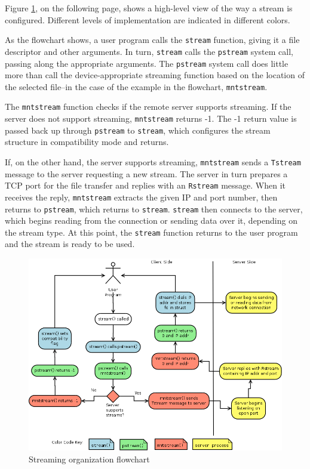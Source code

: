 \documentclass[11pt,american]{report}
\begin{document}
Figure \ref{figure:flowchart}, on the following page, shows a high-level view of the way a stream is configured. Different levels of implementation are indicated in different colors. 

As the flowchart shows, a user program calls the {\tt stream} function, giving it a file descriptor and other arguments. In turn, {\tt stream} calls the {\tt pstream} system call, passing along the appropriate arguments. The {\tt pstream} system call does little more than call the device-appropriate streaming function based on the location of the selected file--in the case of the example in the flowchart, {\tt mntstream}.

The {\tt mntstream} function checks if the remote server supports streaming. If the server does not support streaming, {\tt mntstream} returns -1. The -1 return value is passed back up through {\tt pstream} to {\tt stream}, which configures the stream structure in compatibility mode and returns.

If, on the other hand, the server supports streaming, {\tt mntstream} sends a {\tt Tstream} message to the server requesting a new stream. The server in turn prepares a TCP port for the file transfer and replies with an {\tt Rstream} message. When it receives the reply, {\tt mntstream} extracts the given IP and port number, then returns to {\tt pstream}, which returns to {\tt stream}. {\tt stream} then connects to the server, which begins reading from the connection or sending data over it, depending on the stream type. At this point, the {\tt stream} function returns to the user program and the stream is ready to be used.

\begin{figure}[h]
	\begin{center}
		\includegraphics[width=1\textwidth]{flowchart.png}
	\end{center}
	\caption{Streaming organization flowchart}
	\label{figure:flowchart}
\end{figure}
\end{document}
